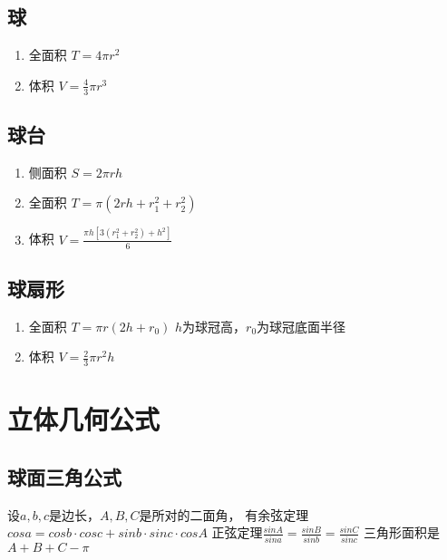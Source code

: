 	\subsection{球}
		\begin{enumerate}\setlength{\itemsep}{-\itemsep}
			\item 全面积
				$T=4\pi r^2$
			\item 体积
				$V=\frac{4}{3}\pi r^3$
		\end{enumerate}
	\subsection{球台}
		\begin{enumerate}\setlength{\itemsep}{-\itemsep}
			\item 侧面积
				$S=2\pi rh$
			\item 全面积
				$T=\pi(2rh+r_1^2+r_2^2)$
			\item 体积
				$V=\frac{\pi h[3(r_1^2+r_2^2)+h^2]}{6}$
		\end{enumerate}
	\subsection{球扇形}
		\begin{enumerate}\setlength{\itemsep}{-\itemsep}
			\item 全面积
				$T=\pi r(2h+r_0)$
				$h$为球冠高，$r_0$为球冠底面半径
			\item 体积
				$V=\frac{2}{3}\pi r^2h$
		\end{enumerate}
\section{立体几何公式}
	\subsection{球面三角公式}
		设$a, b, c$是边长，$A, B, C$是所对的二面角，
		有余弦定理$cos a = cos b \cdot cos c + sin b \cdot sin c \cdot cos A$
		正弦定理$\frac{sin A}{sin a} = \frac{sin B}{sin b} = \frac{sin C}{sin c}$
		三角形面积是$A + B + C - \pi$
